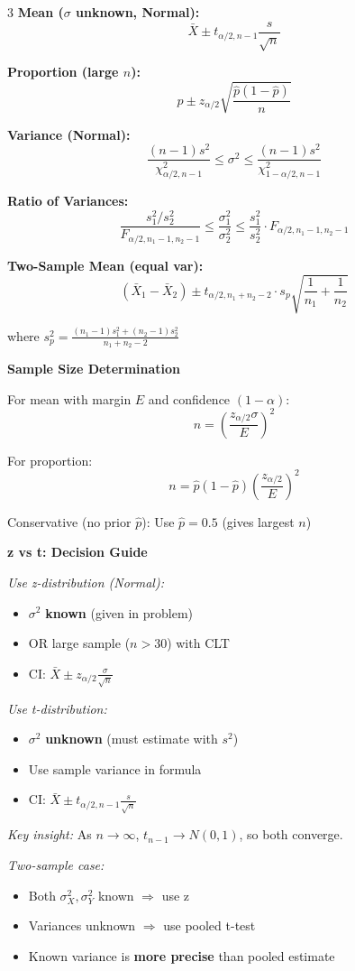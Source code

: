 \documentclass[10pt,letterpaper]{article}
\begin{document}
\begin{multicols}{3}
\textbf{Mean ($\sigma$ unknown, Normal):}
$$\bar{X} \pm t_{\alpha/2, n-1} \frac{s}{\sqrt{n}}$$

\textbf{Proportion (large $n$):}
$$\hat{p} \pm z_{\alpha/2} \sqrt{\frac{\hat{p}(1-\hat{p})}{n}}$$

\textbf{Variance (Normal):}
$$\frac{(n-1)s^2}{\chi^2_{\alpha/2, n-1}} \le \sigma^2 \le \frac{(n-1)s^2}{\chi^2_{1-\alpha/2, n-1}}$$

\textbf{Ratio of Variances:}
$$\frac{s_1^2/s_2^2}{F_{\alpha/2, n_1-1, n_2-1}} \le \frac{\sigma_1^2}{\sigma_2^2} \le \frac{s_1^2}{s_2^2} \cdot F_{\alpha/2, n_1-1, n_2-1}$$

\textbf{Two-Sample Mean (equal var):}
$$(\bar{X}_1 - \bar{X}_2) \pm t_{\alpha/2, n_1+n_2-2} \cdot s_p\sqrt{\frac{1}{n_1} + \frac{1}{n_2}}$$

where $s_p^2 = \frac{(n_1-1)s_1^2 + (n_2-1)s_2^2}{n_1+n_2-2}$

\textbf{Sample Size Determination}

For mean with margin $E$ and confidence $(1-\alpha)$:
$$n = \left(\frac{z_{\alpha/2} \sigma}{E}\right)^2$$

For proportion:
$$n = \hat{p}(1-\hat{p})\left(\frac{z_{\alpha/2}}{E}\right)^2$$

Conservative (no prior $\hat{p}$): Use $\hat{p} = 0.5$ (gives largest $n$)

\textbf{z vs t: Decision Guide}

\textit{Use z-distribution (Normal):}
\begin{itemize}
\item $\sigma^2$ \textbf{known} (given in problem)
\item OR large sample ($n > 30$) with CLT
\item CI: $\bar{X} \pm z_{\alpha/2}\frac{\sigma}{\sqrt{n}}$
\end{itemize}

\textit{Use t-distribution:}
\begin{itemize}
\item $\sigma^2$ \textbf{unknown} (must estimate with $s^2$)
\item Use sample variance in formula
\item CI: $\bar{X} \pm t_{\alpha/2,n-1}\frac{s}{\sqrt{n}}$
\end{itemize}

\textit{Key insight:} As $n \to \infty$, $t_{n-1} \to N(0,1)$, so both converge.

\textit{Two-sample case:}
\begin{itemize}
\item Both $\sigma_X^2, \sigma_Y^2$ known $\Rightarrow$ use z
\item Variances unknown $\Rightarrow$ use pooled t-test
\item Known variance is \textbf{more precise} than pooled estimate
\end{itemize}


\end{multicols}
\end{document}
